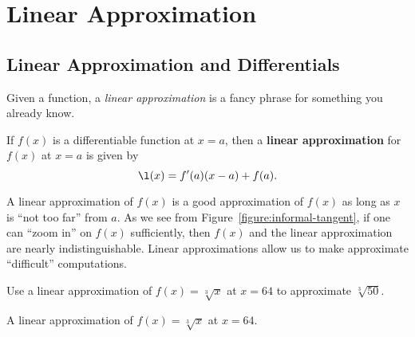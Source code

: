 \chapter{Linear Approximation}

\section{Linear Approximation and Differentials}



Given a function, a \textit{linear approximation} is a fancy phrase
for something you already know.

\begin{definition}
If $f(x)$ is a differentiable function at $x=a$, then a \textbf{linear
  approximation} for $f(x)$ at $x=a$ is given by
\[
\l(x) = f'(a)(x-a) +f(a).
\]
\end{definition}

A linear approximation of $f(x)$ is a good approximation of $f(x)$ as
long as $x$ is ``not too far'' from $a$.  As we see from
Figure~\ref{figure:informal-tangent}, if one can ``zoom in'' on $f(x)$
sufficiently, then $f(x)$ and the linear approximation are nearly
indistinguishable. Linear approximations allow us to make approximate
``difficult'' computations.

\begin{example}
Use a linear approximation of $f(x) =\sqrt[3]{x}$ at $x=64$ to
approximate $\sqrt[3]{50}$.
\end{example}



\begin{marginfigure}
\caption{A linear approximation of $f(x) = \sqrt[3]{x}$ at $x=64$.}
\label{figure:la sqrt3x}
\end{marginfigure}



